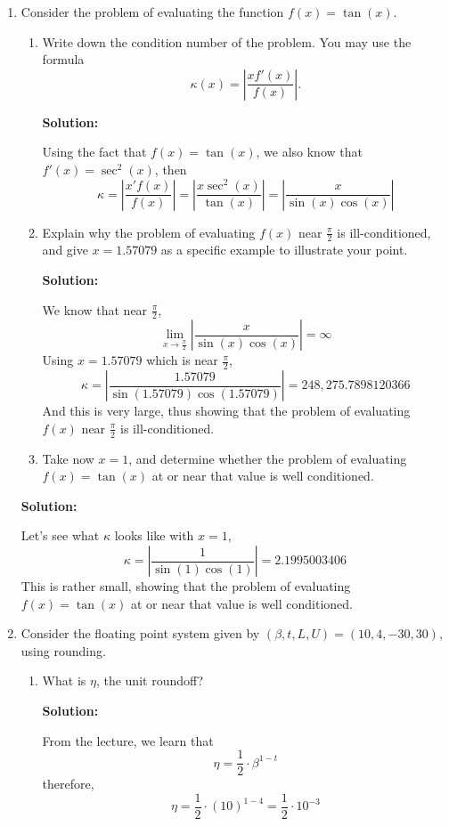 \documentclass[11pt]{article}
\newenvironment{solution}
  {\par\noindent\textbf{Solution:}\par}
  {\par}
\begin{document}
\begin{enumerate}
\begin{enumerate}
\begin{solution}
    \\ 
    To conclude, in terms of both absolute and relative error we have that $T_3(f)$ produces a smaller error,
     
  \end{solution}


\end{enumerate}

\item
Consider the problem of evaluating the function $f(x)=\tan(x)$.
\begin{enumerate} 
\item Write down the condition number of the problem. You may use the formula  $$\kappa(x) = \left| \frac{x f'(x)}{f(x)} \right|. $$
  \begin{solution}
    Using the fact that $f(x)=\tan(x)$, we also know that $f'(x) = \sec^2(x)$, then 
    $$\kappa = \left| \frac{x'f(x)}{f(x)} \right| = \left| \frac{x\sec^2(x)}{\tan(x)} \right| = \left| \frac{x}{\sin(x)\cos(x)} \right|$$
  \end{solution}

\item 
Explain why the problem of evaluating $f(x)$ near $\frac{\pi}{2}$ is ill-conditioned, and give 
$x=1.57079$ as a specific example to illustrate your point.
\begin{solution}
  We know that near $\frac{\pi}{2}$,
  $$\lim_{x \to \frac{\pi}{2}}\left| \frac{x}{\sin(x)\cos(x)} \right| = \infty$$
  Using $x=1.57079$ which is near $\frac{\pi}{2}$,
  $$\kappa = \left| \frac{1.57079}{\sin(1.57079)\cos(1.57079)}\right| = 248,275.7898120366$$
  And this is very large, thus showing that the problem of evaluating $f(x)$ near $\frac{\pi}{2}$ is ill-conditioned.
\end{solution}



\item Take now $x=1$, and determine whether the problem of evaluating $f(x)=\tan(x)$ at or near that value is well conditioned.
\end{enumerate}

\begin{solution}
  Let's see what $\kappa$ looks like with $x=1$,
  $$\kappa = \left| \frac{1}{\sin(1)\cos(1)} \right| = 2.1995003406$$
  This is rather small, showing that the problem of evaluating $f(x)=\tan(x)$ at or near that value is well conditioned.
\end{solution}

\item  
Consider the floating point system given by $(\beta,t,L,U)=(10,4,-30,30)$, using rounding. 
\begin{enumerate}
\item What is $\eta$, the unit roundoff?
  \begin{solution}
    From the lecture, we learn that
    $$\eta = \frac{1}{2} \cdot \beta^{1 - t}$$
    therefore, $$\eta = \frac{1}{2} \cdot (10)^{1 - 4} = \frac{1}{2} \cdot 10^{-3} $$
  \end{solution}
  

\end{enumerate}
\end{enumerate}
\end{document}
